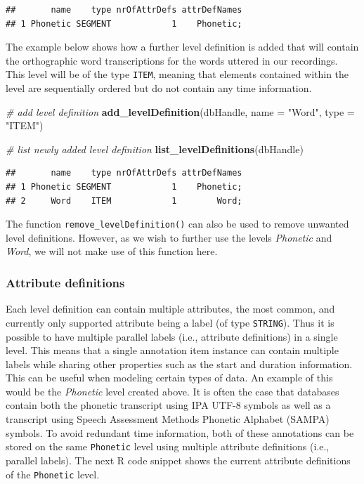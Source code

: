 \documentclass[]{book}
\newenvironment{Shaded}{\begin{snugshade}}{\end{snugshade}}
\newcommand{\CommentTok}[1]{\textcolor[rgb]{0.56,0.35,0.01}{\textit{#1}}}
\newcommand{\DataTypeTok}[1]{\textcolor[rgb]{0.13,0.29,0.53}{#1}}
\newcommand{\KeywordTok}[1]{\textcolor[rgb]{0.13,0.29,0.53}{\textbf{#1}}}
\newcommand{\NormalTok}[1]{#1}
\newcommand{\StringTok}[1]{\textcolor[rgb]{0.31,0.60,0.02}{#1}}
\begin{document}
\begin{verbatim}
##       name    type nrOfAttrDefs attrDefNames
## 1 Phonetic SEGMENT            1    Phonetic;
\end{verbatim}

The example below shows how a further level definition is added that will contain the orthographic word transcriptions for the words uttered in our recordings. This level will be of the type \texttt{ITEM}, meaning that elements contained within the level are sequentially ordered but do not contain any time information.

\begin{Shaded}
\begin{Highlighting}[]
\CommentTok{# add level definition}
\KeywordTok{add_levelDefinition}\NormalTok{(dbHandle,}
                    \DataTypeTok{name =} \StringTok{"Word"}\NormalTok{,}
                    \DataTypeTok{type =} \StringTok{"ITEM"}\NormalTok{)}

\CommentTok{# list newly added level definition}
\KeywordTok{list_levelDefinitions}\NormalTok{(dbHandle)}
\end{Highlighting}
\end{Shaded}

\begin{verbatim}
##       name    type nrOfAttrDefs attrDefNames
## 1 Phonetic SEGMENT            1    Phonetic;
## 2     Word    ITEM            1        Word;
\end{verbatim}

The function \texttt{remove\_levelDefinition()} can also be used to remove unwanted level definitions. However, as we wish to further use the levels \emph{Phonetic} and \emph{Word}, we will not make use of this function here.

\hypertarget{attribute-definitions}{%
\subsubsection{Attribute definitions}\label{attribute-definitions}}

Each level definition can contain multiple attributes, the most common, and currently only supported attribute being a label (of type \texttt{STRING}). Thus it is possible to have multiple parallel labels (i.e., attribute definitions) in a single level. This means that a single annotation item instance can contain multiple labels while sharing other properties such as the start and duration information. This can be useful when modeling certain types of data. An example of this would be the \emph{Phonetic} level created above. It is often the case that databases contain both the phonetic transcript using IPA UTF-8 symbols as well as a transcript using Speech Assessment Methods Phonetic Alphabet (SAMPA) symbols. To avoid redundant time information, both of these annotations can be stored on the same \texttt{Phonetic} level using multiple attribute definitions (i.e., parallel labels). The next R code snippet shows the current attribute definitions of the \texttt{Phonetic} level.
\end{document}
